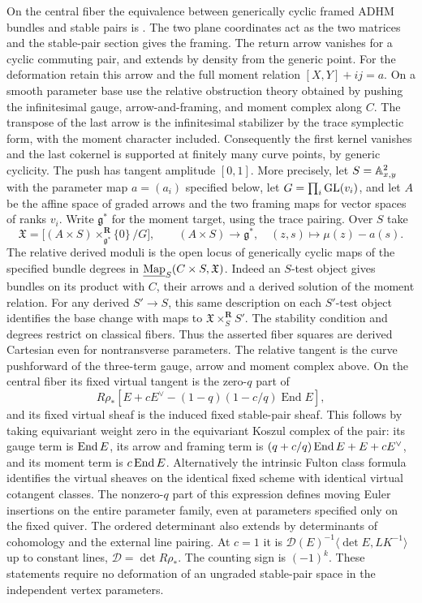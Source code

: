 On the central fiber the equivalence between generically cyclic framed ADHM bundles and stable pairs is \cite[Theorem~1.9]{Di}. The two plane coordinates act as the two matrices and the stable-pair section gives the framing. The return arrow vanishes for a cyclic commuting pair, and extends by density from the generic point. For the deformation retain this arrow and the full moment relation $[X,Y]+ij=a$. On a smooth parameter base use the relative obstruction theory obtained by pushing the infinitesimal gauge, arrow-and-framing, and moment complex along $C$. The transpose of the last arrow is the infinitesimal stabilizer by the trace symplectic form, with the moment character included. Consequently the first kernel vanishes and the last cokernel is supported at finitely many curve points, by generic cyclicity. The push has tangent amplitude $[0,1]$. More precisely, let $S=\mathbb A^2_{x,y}$ with the parameter map $a=(a_i)$ specified below, let $G=\prod_i{\rm GL}(v_i)$, and let $A$ be the affine space of graded arrows and the two framing maps for vector spaces of ranks $v_i$. Write $\mathfrak g^*$ for the moment target, using the trace pairing. Over $S$ take
\[
 \mathfrak X=\big[(A\times S)\mathop{\times}^{\mathbf R}_{\mathfrak g^*} \{0\}\,/G\big],
 \qquad (A\times S)\longrightarrow \mathfrak g^*,\quad (z,s)\longmapsto\mu(z)-a(s).
\]
The relative derived moduli is the open locus of generically cyclic maps of the specified bundle degrees in $\underline{\rm Map}_S(C\times S,\mathfrak X)$. Indeed an $S$-test object gives bundles on its product with $C$, their arrows and a derived solution of the moment relation. For any derived $S'\to S$, this same description on each $S'$-test object identifies the base change with maps to $\mathfrak X\times_S^{\mathbf R}S'$. The stability condition and degrees restrict on classical fibers. Thus the asserted fiber squares are derived Cartesian even for nontransverse parameters. The relative tangent is the curve pushforward of the three-term gauge, arrow and moment complex above. On the central fiber its fixed virtual tangent is the zero-$q$ part of
\[
R\rho_*[E+cE^\vee-(1-q)(1-c/q)\operatorname{End} E],
\]
and its fixed virtual sheaf is the induced fixed stable-pair sheaf. This follows by taking equivariant weight zero in the equivariant Koszul complex of the pair: its gauge term is $\operatorname{End} E$, its arrow and framing term is $(q+c/q)\operatorname{End} E+E+cE^\vee$, and its moment term is $c\operatorname{End} E$. Alternatively the intrinsic Fulton class formula \cite[Theorem~4.2]{Th} identifies the virtual sheaves on the identical fixed scheme with identical virtual cotangent classes. The nonzero-$q$ part of this expression defines moving Euler insertions on the entire parameter family, even at parameters specified only on the fixed quiver. The ordered determinant also extends by determinants of cohomology and the external line pairing. At $c=1$ it is $\mathcal D(E)^{-1}\langle\det E,LK^{-1}\rangle$ up to constant lines, $\mathcal D=\det R\rho_*$. The counting sign is $(-1)^k$. These statements require no deformation of an ungraded stable-pair space in the independent vertex parameters.

